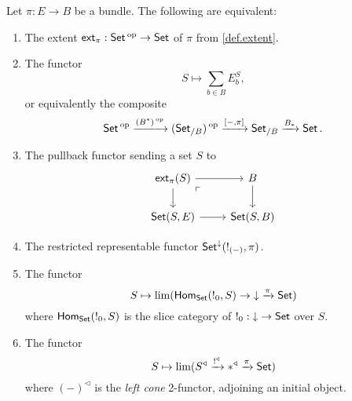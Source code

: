 \begin{prop}\label{prop:set.characterizing.extent}
  Let $\pi : E \to B$ be a bundle. The following are equivalent:
  \begin{enumerate}
  \item The extent $\ext_{\pi} : \Set\op \to \Set$ of $\pi$ from \cref{def.extent}.
  \item The functor
    $$S \mapsto \sum_{b \in B} E_b^S,$$
    or equivalently the composite
  $$\Set\op \xto{(B^{\ast})\op} (\Set_{/B})\op \xto{[-, \pi]} \Set_{/B}
  \xto{B_{\ast}} \Set.$$
\item {} The pullback functor sending a set $S$ to 
\[
\begin{tikzcd}
	\ext_\pi(S)\ar[r]\ar[d]\arrow[dr, phantom,
      "\ulcorner" very near start]&
	B\ar[d]\\
	\Set(S,E)\ar[r]&
	\Set(S,B)
\end{tikzcd}
\]
\item The restricted representable functor
  $\Set^{\down}(!_{(-)}, \pi)$.
\item The functor
  $$S \mapsto \lim(\Hom_{\Set}(!_0, S) \to \down \xto{\pi} \Set)$$
  where $\Hom_{\Set}(!_0, S)$ is the slice category of $!_0 : \down \to
  \Set$ over $S$.
\item The functor
  $$S \mapsto \lim(S^{\triangleleft} \xto{!^{\triangleleft}} \ast^{\triangleleft}
  \xto{\pi} \Set)$$
  where $(-)^{\triangleleft}$ is the \emph{left cone} 2-functor, adjoining an initial object.
  \end{enumerate}
\end{prop}
